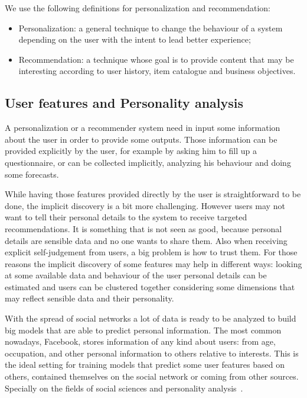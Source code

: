 We use the following definitions for personalization and recommendation:

\begin{itemize}
	\item Personalization: a general technique to change the behaviour of a system depending on the user with the intent to lead better experience;

	\item Recommendation: a technique whose goal is to provide content that may be interesting according to user history, item catalogue and business objectives.
\end{itemize}

\subsection{User features and Personality analysis}
\label{soaPersonalizationFeatures}

A personalization or a recommender system need in input some information about the user in order to provide some outputs. Those information can be provided explicitly by the user, for example by asking him to fill up a questionnaire, or can be collected implicitly, analyzing his behaviour and doing some forecasts.

While having those features provided directly by the user is straightforward to be done, the implicit discovery is a bit more challenging. However users may not want to tell their personal details to the system to receive targeted recommendations. It is something that is not seen as good, because personal details are sensible data and no one wants to share them. Also when receiving explicit self-judgement from users, a big problem is how to trust them. For those reasons the implicit discovery of some features may help in different ways: looking at some available data and behaviour of the user personal details can be estimated and users can be clustered together considering some dimensions that may reflect sensible data and their personality.

With the spread of social networks a lot of data is ready to be analyzed to build big models that are able to predict personal information. The most common nowadays, Facebook, stores information of any kind about users: from age, occupation, and other personal information to others relative to interests. This is the ideal setting for training models that predict some user features based on others, contained themselves on the social network or coming from other sources. Specially on the fields of social sciences and personality analysis~\cite{kosinski2015facebook}.

